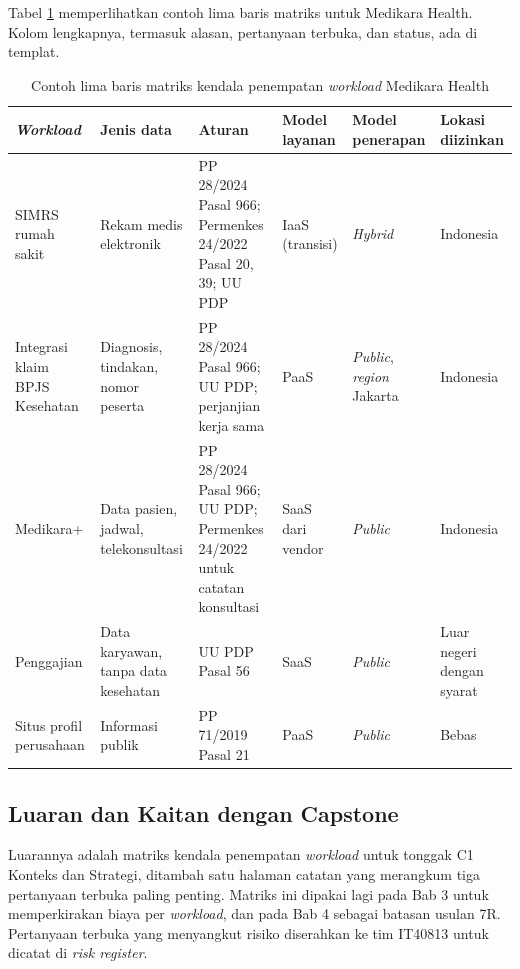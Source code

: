 Tabel \ref{tab:ch02-contoh-matriks} memperlihatkan contoh lima baris matriks untuk Medikara
Health. Kolom lengkapnya, termasuk alasan, pertanyaan terbuka, dan status, ada di templat.

\begin{table}[!htb]
  \centering
  \caption{Contoh lima baris matriks kendala penempatan \textit{workload} Medikara Health}
  \label{tab:ch02-contoh-matriks}
  \footnotesize
  \begin{tabularx}{\textwidth}{>{\raggedright\arraybackslash}p{1.6cm}
      >{\raggedright\arraybackslash}X >{\raggedright\arraybackslash}X
      >{\raggedright\arraybackslash}p{1.4cm} >{\raggedright\arraybackslash}p{1.45cm}
      >{\raggedright\arraybackslash}p{1.75cm}}
    \hline
    \textbf{\textit{Workload}} & \textbf{Jenis data} & \textbf{Aturan} & \textbf{Model
      layanan} & \textbf{Model penerapan} & \textbf{Lokasi diizinkan} \\
    \hline
    SIMRS rumah sakit & Rekam medis elektronik & PP 28/2024 Pasal 966; Permenkes 24/2022
      Pasal 20, 39; UU PDP & IaaS (transisi) & \textit{Hybrid} & Indonesia \\
    \hline
    Integrasi klaim BPJS Kesehatan & Diagnosis, tindakan, nomor peserta & PP 28/2024 Pasal 966;
      UU PDP; perjanjian kerja sama & PaaS & \textit{Public}, \textit{region} Jakarta & Indonesia \\
    \hline
    Medikara+ & Data pasien, jadwal, telekonsultasi & PP 28/2024 Pasal 966; UU PDP; Permenkes
      24/2022 untuk catatan konsultasi & SaaS dari vendor & \textit{Public} & Indonesia \\
    \hline
    Penggajian & Data karyawan, tanpa data kesehatan & UU PDP Pasal 56 & SaaS & \textit{Public}
      & Luar negeri dengan syarat \\
    \hline
    Situs profil perusahaan & Informasi publik & PP 71/2019 Pasal 21 & PaaS &
      \textit{Public} & Bebas \\
    \hline
  \end{tabularx}
\end{table}

\subsection*{Luaran dan Kaitan dengan Capstone}

Luarannya adalah matriks kendala penempatan \textit{workload} untuk tonggak C1 Konteks dan
Strategi, ditambah satu halaman catatan yang merangkum tiga pertanyaan terbuka paling
penting. Matriks ini dipakai lagi pada Bab 3 untuk memperkirakan biaya per
\textit{workload}, dan pada Bab 4 sebagai batasan usulan 7R. Pertanyaan terbuka yang
menyangkut risiko diserahkan ke tim IT40813 untuk dicatat di \textit{risk register}.

